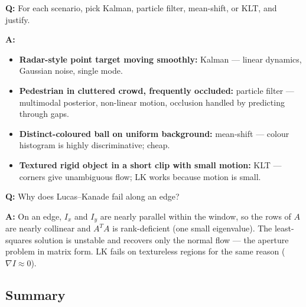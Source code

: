 \begin{exbox}
\textbf{Q:} For each scenario, pick Kalman, particle filter, mean-shift, or KLT, and justify.

\textbf{A:}
\begin{itemize}
  \item \textbf{Radar-style point target moving smoothly:} Kalman --- linear dynamics, Gaussian noise, single mode.
  \item \textbf{Pedestrian in cluttered crowd, frequently occluded:} particle filter --- multimodal posterior, non-linear motion, occlusion handled by predicting through gaps.
  \item \textbf{Distinct-coloured ball on uniform background:} mean-shift --- colour histogram is highly discriminative; cheap.
  \item \textbf{Textured rigid object in a short clip with small motion:} KLT --- corners give unambiguous flow; LK works because motion is small.
\end{itemize}
\end{exbox}

\begin{exbox}
\textbf{Q:} Why does Lucas--Kanade fail along an edge?

\textbf{A:} On an edge, $I_x$ and $I_y$ are nearly parallel within the window, so the rows of $A$ are nearly collinear and $A^T A$ is rank-deficient (one small eigenvalue). The least-squares solution is unstable and recovers only the normal flow --- the aperture problem in matrix form. LK fails on textureless regions for the same reason ($\nabla I \approx 0$).
\end{exbox}

\bigseparator

\subsection{Summary}

